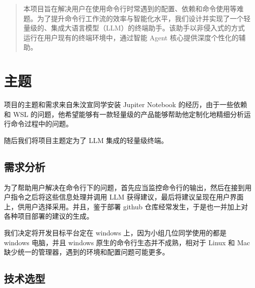 \documentclass{article}
\theoremstyle{plain}
\theoremstyle{definition}
\theoremstyle{remark}
\begin{document}

\begin{abstract}
本项目旨在解决用户在使用命令行时常遇到的配置、依赖和命令使用等难题。为了提升命令行工作流的效率与智能化水平，我们设计并实现了一个轻量级的、集成大语言模型（LLM）的终端助手。该助手以非侵入式的方式运行在用户现有的终端环境中，通过智能 Agent 核心提供深度个性化的辅助。
\end{abstract}

\section{主题}

项目的主题和需求来自朱汶宣同学安装 Jupiter Notebook 的经历，由于一些依赖和 WSL 的问题，他希望能够有一款轻量级的产品能够帮助他定制化地精细分析运行命令过程中的问题。

随后我们将项目主题定为了 LLM 集成的轻量级终端。

\subsection{需求分析}

为了帮助用户解决在命令行下的问题，首先应当监控命令行的输出，然后在接到用户指令之后将这些信息处理并调用 LLM 获得建议，最后将建议呈现在用户界面上，供用户选择采用。并且，鉴于部署 github 仓库经常发生，于是也一并加上对各种项目部署的建议的生成。

我们决定将开发目标平台定在 windows 上，因为小组几位同学使用的都是 windows 电脑，并且 windows 原生的命令行生态并不成熟，相对于 Linux 和 Mac 缺少统一的管理器，遇到的环境和配置问题可能更多。

\subsection{技术选型}
\end{document}
